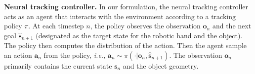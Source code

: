 
\noindent\textbf{Neural tracking controller.} 
In our formulation, the neural tracking controller acts as an agent that interacts with the environment according to a tracking policy \(\pi\). At each timestep \(n\), the policy observes the observation \(\mathbf{o}_n\) and the next goal \(\hat{\mathbf{s}}_{n+1}\) (designated as the target state for the robotic hand and the object). The policy then computes the distribution of the action. Then the agent sample an action $\mathbf{a}_n$ from the policy, \emph{i.e.,} \(\mathbf{a}_n \sim \pi(\cdot \vert \mathbf{o}_n, \hat{\mathbf{s}}_{n+1})\). The observation $\mathbf{o}_n$ primarily contains the current state $\mathbf{s}_n$ and the object geometry. 
